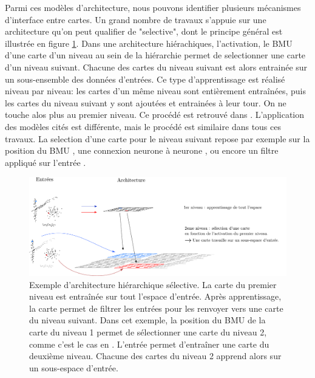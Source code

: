 \documentclass[../main]{subfiles}
\begin{document}
Parmi ces modèles d'architecture, nous pouvons identifier plusieurs mécanismes d'interface entre cartes.
Un grand nombre de travaux s'appuie sur une architecture qu'on peut qualifier de "selective", dont le principe général est illustrée en figure \ref{fig:hsom_selective}.
Dans une architecture hiérachiques, l'activation, le BMU d'une carte d'un niveau au sein de la hiérarchie permet de selectionner une carte d'un niveau suivant. Chacune des cartes du niveau suivant est alors entrainée sur un sous-ensemble des données d'entrées. Ce type d'apprentissage est réalisé niveau par niveau: les cartes d'un même niveau sont entièrement entraînées, puis les cartes du niveau suivant y sont ajoutées et entrainées à leur tour. On ne touche alos plus au premier niveau. 
Ce procédé est retrouvé dans \cite{barbalho_hierarchical_2001,suganthan_pattern_2001,miikkulainen_script_1992,dittenbach_growing_2000,ordonez_hierarchical_2010,zhao_stacked_2015}. L'application des modèles cités est différente, mais le procédé est similaire dans tous ces travaux.
La selection d'une carte pour le niveau suivant repose par exemple sur la position du BMU \cite{barbalho_hierarchical_2001}, une connexion neurone à neurone \cite{??}, ou encore un filtre appliqué sur l'entrée \cite{zhao_stacked_2015}.

\begin{figure}
    \includegraphics[width=\textwidth]{HSOM_selective.pdf}
    \caption{Exemple d'architecture hiérarchique sélective. La carte du premier niveau est entraînée sur tout l'espace d'entrée. Après apprentissage, la carte permet de filtrer les entrées pour les renvoyer vers une carte du niveau suivant. Dans cet exemple, la position du BMU de la carte du niveau 1 permet de sélectionner une carte du niveau 2, comme c'est le cas en \cite{barbalho_hierarchical_2001}. 
    L'entrée permet d'entraîner une carte du deuxième niveau. Chacune des cartes du niveau 2 apprend alors sur un sous-espace d'entrée.\label{fig:hsom_selective}}
\end{figure}
\end{document}
